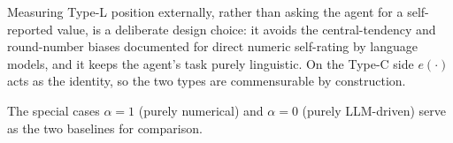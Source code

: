 \textcolor{revgreen}{Measuring Type-L position externally, rather than asking the agent for a
self-reported value, is a deliberate design choice: it avoids the central-tendency and
round-number biases documented for direct numeric self-rating by language models, and it
keeps the agent's task purely linguistic. On the Type-C side $e(\cdot)$ acts as the
identity, so the two types are commensurable by construction.}

The special cases $\alpha = 1$ (purely numerical) and $\alpha = 0$ (purely LLM-driven) serve as the two baselines for comparison.
